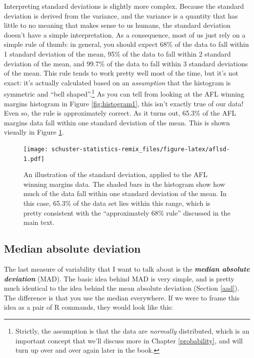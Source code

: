 \documentclass[
]{book}
\begin{document}
Interpreting standard deviations is slightly more complex. Because the standard deviation is derived from the variance, and the variance is a quantity that has little to no meaning that makes sense to us humans, the standard deviation doesn't have a simple interpretation. As a consequence, most of us just rely on a simple rule of thumb: in general, you should expect 68\% of the data to fall within 1 standard deviation of the mean, 95\% of the data to fall within 2 standard deviation of the mean, and 99.7\% of the data to fall within 3 standard deviations of the mean. This rule tends to work pretty well most of the time, but it's not exact: it's actually calculated based on an \emph{assumption} that the histogram is symmetric and ``bell shaped''.\footnote{Strictly, the assumption is that the data are \emph{normally} distributed, which is an important concept that we'll discuss more in Chapter \ref{probability}, and will turn up over and over again later in the book.} As you can tell from looking at the AFL winning margins histogram in Figure \ref{fig:histogram1}, this isn't exactly true of our data! Even so, the rule is approximately correct. As it turns out, 65.3\% of the AFL margins data fall within one standard deviation of the mean. This is shown visually in Figure \ref{fig:aflsd}.

\begin{figure}
\centering
\texttt{[image: schuster-statistics-remix\_files/figure-latex/aflsd-1.pdf]}
\caption{\label{fig:aflsd}An illustration of the standard deviation, applied to the AFL winning margins data. The shaded bars in the histogram show how much of the data fall within one standard deviation of the mean. In this case, 65.3\% of the data set lies within this range, which is pretty consistent with the ``approximately 68\% rule'' discussed in the main text.}
\end{figure}

\hypertarget{mad}{%
\subsection{Median absolute deviation}\label{mad}}

The last measure of variability that I want to talk about is the \textbf{\emph{median absolute deviation}} (MAD). The basic idea behind MAD is very simple, and is pretty much identical to the idea behind the mean absolute deviation (Section \ref{aad}). The difference is that you use the median everywhere. If we were to frame this idea as a pair of R commands, they would look like this:
\end{document}
